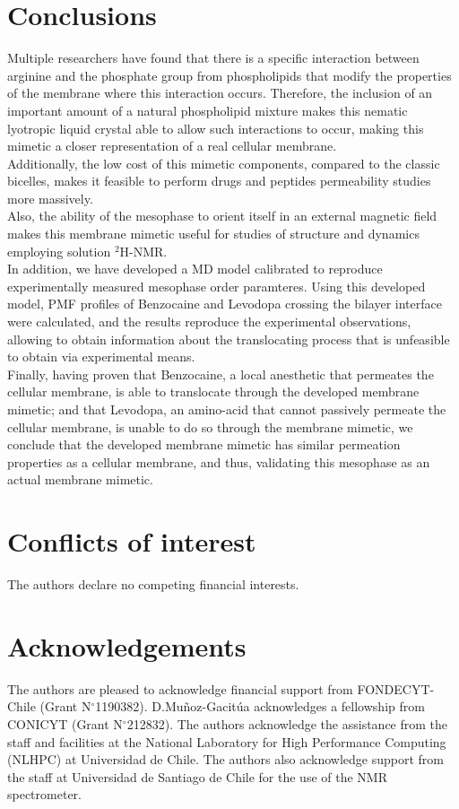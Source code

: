 \documentclass[3p,preprint,review]{elsarticle}
\begin{document}
	\section{Conclusions}
	Multiple researchers\cite{Aliaga2011,Hristova2011} have found
	that there is a specific interaction between arginine and the phosphate group
	from
	phospholipids
	that modify the properties of the membrane where this interaction occurs.
	Therefore, the inclusion of an important amount of a natural phospholipid
	mixture makes this nematic lyotropic liquid crystal able to allow such
	interactions to occur, making this mimetic a closer representation of a real
	cellular membrane.\\
	Additionally, the low cost of this mimetic components, compared to the classic
	bicelles, makes it feasible to perform drugs and peptides permeability studies
	more massively.\\
	Also, the ability of the mesophase to orient itself in an external magnetic
	field
	makes this membrane mimetic useful for studies of structure and dynamics
	employing solution
	$^2$H-NMR.\\
	In addition, we have developed a MD model calibrated to reproduce
	experimentally measured mesophase order paramteres. Using this developed model,
	PMF profiles of Benzocaine and Levodopa crossing the bilayer interface were
	calculated, and the results reproduce the experimental observations, allowing to
	obtain information about the translocating process that is	unfeasible to obtain
	via experimental means.\\
	Finally, having proven that Benzocaine, a local anesthetic that permeates
	the cellular membrane, is able to translocate through the developed membrane
	mimetic; and that Levodopa, an amino-acid that cannot passively permeate the
	cellular membrane, is unable to do so through the membrane
	mimetic, we conclude that the developed membrane mimetic has
	similar permeation properties as a cellular membrane, and thus, validating this
	mesophase as an actual
	membrane mimetic.\\
	
	
	\section*{Conflicts of interest}
	The authors declare no competing financial interests.
	
	\section*{Acknowledgements}
	The authors are pleased to acknowledge financial support from FONDECYT-Chile
	(Grant N$^\circ$1190382). D.Muñoz-Gacitúa acknowledges a fellowship from
	CONICYT
	(Grant N$^\circ$212832). The authors acknowledge the assistance from the
	staff and facilities at the National Laboratory for High Performance Computing
	(NLHPC) at Universidad de Chile. The authors also acknowledge support from the
	staff at Universidad de Santiago de Chile for the use of the NMR spectrometer.
	
\end{document}
